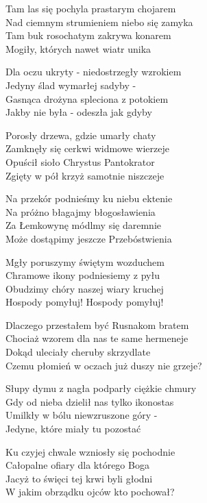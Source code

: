 \begin{text}
    \begin{scriptTwelve}
    Tam las się pochyla prastarym chojarem\\
    Nad ciemnym strumieniem niebo się zamyka\\
    Tam buk rosochatym zakrywa konarem\\
    Mogiły, których nawet wiatr unika

    Dla oczu ukryty - niedostrzegły wzrokiem\\
    Jedyny ślad wymarłej sadyby -\\
    Gasnąca drożyna spleciona z potokiem\\
    Jakby nie była - odeszła jak gdyby

    Porosły drzewa, gdzie umarły chaty\\
    Zamknęły się cerkwi widmowe wierzeje\\
    Opuścił sioło Chrystus Pantokrator\\
    Zgięty w pół krzyż samotnie niszczeje

    \vin Na przekór podnieśmy ku niebu ektenie\\
    \vin Na próżno błagajmy błogosławienia\\
    \vin Za Łemkowynę módlmy się daremnie\\
    \vin Może dostąpimy jeszcze Przebóstwienia

    \vin Mgły poruszymy świętym wozduchem\\
    \vin Chramowe ikony podniesiemy z pyłu\\
    \vin Obudzimy chóry naszej wiary kruchej\\
    \vin Hospody pomyłuj! Hospody pomyłuj!

    Dlaczego przestałem być Rusnakom bratem\\
    Chociaż wzorem dla nas te same hermeneje\\
    Dokąd uleciały cheruby skrzydlate\\
    Czemu płomień w oczach już duszy nie grzeje?

    Słupy dymu z nagła podparły ciężkie chmury\\
    Gdy od nieba dzielił nas tylko ikonostas\\
    Umilkły w bólu niewzruszone góry -\\
    Jedyne, które miały tu pozostać

    Ku czyjej chwale wzniosły się pochodnie\\
    Całopalne ofiary dla którego Boga\\
    Jacyż to święci tej krwi byli głodni\\
    W jakim obrządku ojców kto pochował?


\end{scriptTwelve}
\end{text}
